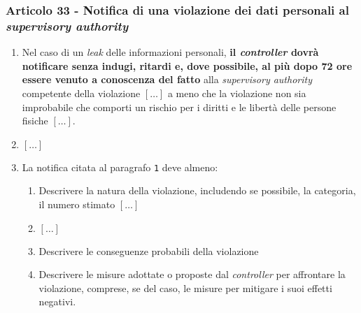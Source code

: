         \subsubsection{Articolo 33 - Notifica di una violazione dei dati personali al \textit{supervisory authority}}
            \begin{enumerate}
                \item Nel caso di un \textit{leak} delle informazioni personali, \textbf{il \textit{controller} dovrà notificare senza indugi, ritardi e, dove possibile, al più dopo 72 ore essere venuto a conoscenza del fatto} alla \textit{supervisory authority} competente della violazione $[\dots]$ a meno che la violazione non sia improbabile che comporti un rischio per i diritti e le libertà delle persone fisiche $[\dots]$.
                \item $[\dots]$
                \item La notifica citata al paragrafo \texttt{1} deve almeno:
                    \begin{enumerate}
                        \item Descrivere la natura della violazione, includendo se possibile, la categoria, il numero stimato $[\dots]$
                        \item $[\dots]$
                        \item Descrivere le conseguenze probabili della violazione
                        \item Descrivere le misure adottate o proposte dal \textit{controller} per affrontare la violazione, comprese, se del caso, le misure per mitigare i suoi effetti negativi.
                    \end{enumerate}
                \end{enumerate}
